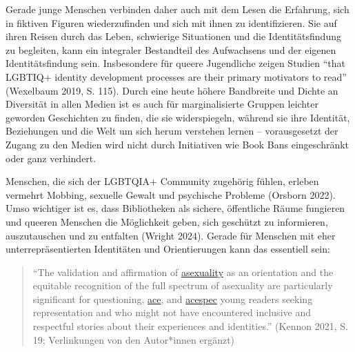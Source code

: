 \documentclass[a4paper,
fontsize=11pt,
oneside,
numbers=noperiodatend,
parskip=half-,
bibliography=totoc,
final
]{scrartcl}
\begin{document}
Gerade junge Menschen verbinden daher auch mit dem Lesen die Erfahrung,
sich in fiktiven Figuren wiederzufinden und sich mit ihnen zu
identifizieren. Sie auf ihren Reisen durch das Leben, schwierige
Situationen und die Identitätsfindung zu begleiten, kann ein integraler
Bestandteil des Aufwachsens und der eigenen Identitätsfindung sein.
Insbesondere für queere Jugendliche zeigen Studien \enquote{that LGBTIQ+
identity development processes are their primary motivators to read}
(Wexelbaum 2019, S. 115). Durch eine heute höhere Bandbreite und Dichte
an Diversität in allen Medien ist es auch für marginalisierte Gruppen
leichter geworden Geschichten zu finden, die sie widerspiegeln, während
sie ihre Identität, Beziehungen und die Welt um sich herum verstehen
lernen -- vorausgesetzt der Zugang zu den Medien wird nicht durch
Initiativen wie Book Bans eingeschränkt oder ganz verhindert.

Menschen, die sich der LGBTQIA+ Community zugehörig fühlen, erleben
vermehrt Mobbing, sexuelle Gewalt und psychische Probleme (Orsborn
2022). Umso wichtiger ist es, dass Bibliotheken als sichere, öffentliche
Räume fungieren und queeren Menschen die Möglichkeit geben, sich
geschützt zu informieren, auszutauschen und zu entfalten (Wright 2024).
Gerade für Menschen mit eher unterrepräsentierten Identitäten und
Orientierungen kann das essentiell sein:

\begin{quote}
\enquote{The validation and affirmation of
\href{https://lgbtqia.fandom.com/wiki/Asexual}{asexuality} as an
orientation and the equitable recognition of the full spectrum of
asexuality are particularly significant for questioning,
\href{https://lgbtqia.fandom.com/wiki/Asexual}{ace}, and
\href{https://lgbtqia.fandom.com/wiki/Asexual_spectrum}{acespec} young
readers seeking representation and who might not have encountered
inclusive and respectful stories about their experiences and
identities.} (Kennon 2021, S. 19; Verlinkungen von den Autor*innen
ergänzt)
\end{quote}
\end{document}
